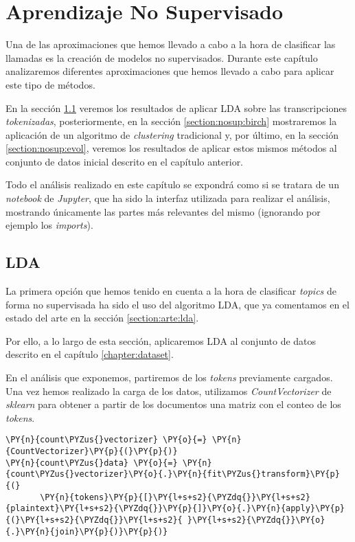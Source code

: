 \chapter{Aprendizaje No Supervisado}
\label{chapter:nosup}

Una de las aproximaciones que hemos llevado a cabo a la hora de clasificar las llamadas es la creación de modelos no supervisados. Durante este capítulo analizaremos diferentes aproximaciones que hemos llevado a cabo para aplicar este tipo de métodos. 

En la sección \ref{section:nosup:lda} veremos los resultados de aplicar LDA sobre las transcripciones \textit{tokenizadas}, posteriormente, en la sección \ref{section:nosup:birch} mostraremos la aplicación de un algoritmo de \textit{clustering} tradicional y, por último, en la sección \ref{section:nosup:evol}, veremos los resultados de aplicar estos mismos métodos al conjunto de datos inicial descrito en el capítulo anterior.


Todo el análisis realizado en este capítulo se expondrá como si se tratara de un \textit{notebook} de \textit{Jupyter}, que ha sido la interfaz utilizada para realizar el análisis, mostrando únicamente las partes más relevantes del mismo (ignorando por ejemplo los \textit{imports}).


\section{LDA}
\label{section:nosup:lda}
La primera opción que hemos tenido en cuenta a la hora de clasificar \textit{topics} de forma no supervisada ha sido el uso del algoritmo LDA, que ya comentamos en el estado del arte en la sección \ref{section:arte:lda}.

Por ello, a lo largo de esta sección, aplicaremos LDA al conjunto de datos descrito en el capítulo \ref{chapter:dataset}. 


En el análisis que exponemos, partiremos de los \textit{tokens} previamente cargados. Una vez hemos realizado la carga de los datos, utilizamos \textit{CountVectorizer} de \textit{sklearn} para obtener a partir de los documentos una matriz con el conteo de los \textit{tokens}.

\vspace{0.5cm}
   \begin{tcolorbox}[breakable, size=fbox, boxrule=1pt, pad at break*=1mm,colback=cellbackground, colframe=cellborder]
\begin{Verbatim}[commandchars=\\\{\}]
\PY{n}{count\PYZus{}vectorizer} \PY{o}{=} \PY{n}{CountVectorizer}\PY{p}{(}\PY{p}{)}
\PY{n}{count\PYZus{}data} \PY{o}{=} \PY{n}{count\PYZus{}vectorizer}\PY{o}{.}\PY{n}{fit\PYZus{}transform}\PY{p}{(}
       \PY{n}{tokens}\PY{p}{[}\PY{l+s+s2}{\PYZdq{}}\PY{l+s+s2}{plaintext}\PY{l+s+s2}{\PYZdq{}}\PY{p}{]}\PY{o}{.}\PY{n}{apply}\PY{p}{(}\PY{l+s+s2}{\PYZdq{}}\PY{l+s+s2}{ }\PY{l+s+s2}{\PYZdq{}}\PY{o}{.}\PY{n}{join}\PY{p}{)}\PY{p}{)}      
\end{Verbatim}
\end{tcolorbox}

